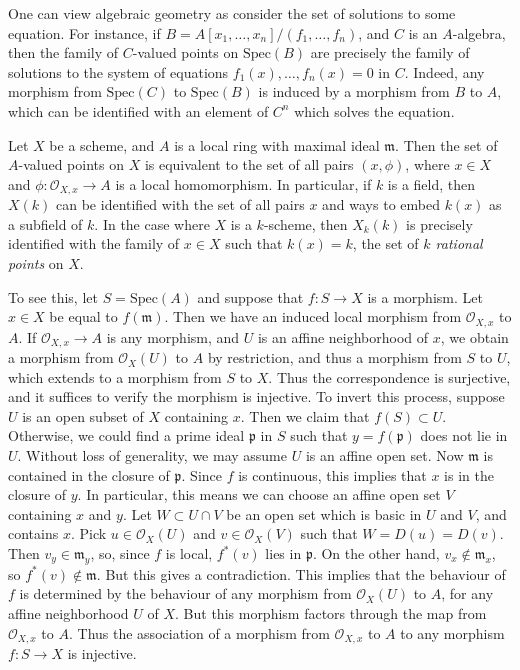 \begin{example}
    One can view algebraic geometry as consider the set of solutions to some equation. For instance, if $B = A[x_1,\dots,x_n]/(f_1,\dots,f_n)$, and $C$ is an $A$-algebra, then the family of $C$-valued points on $\text{Spec}(B)$ are precisely the family of solutions to the system of equations $f_1(x), \dots, f_n(x) = 0$ in $C$. Indeed, any morphism from $\text{Spec}(C)$ to $\text{Spec}(B)$ is induced by a morphism from $B$ to $A$, which can be identified with an element of $C^n$ which solves the equation.
\end{example}

\begin{example}
    Let $X$ be a scheme, and $A$ is a local ring with maximal ideal $\mathfrak{m}$. Then the set of $A$-valued points on $X$ is equivalent to the set of all pairs $(x,\phi)$, where $x \in X$ and $\phi: \mathcal{O}_{X,x} \to A$ is a local homomorphism. In particular, if $k$ is a field, then $X(k)$ can be identified with the set of all pairs $x$ and ways to embed $k(x)$ as a subfield of $k$. In the case where $X$ is a $k$-scheme, then $X_k(k)$ is precisely identified with the family of $x \in X$ such that $k(x) = k$, the set of \emph{$k$ rational points} on $X$.

    To see this, let $S = \text{Spec}(A)$ and suppose that $f: S \to X$ is a morphism. Let $x \in X$ be equal to $f(\mathfrak{m})$. Then we have an induced local morphism from $\mathcal{O}_{X,x}$ to $A$. If $\mathcal{O}_{X,x} \to A$ is any morphism, and $U$ is an affine neighborhood of $x$, we obtain a morphism from $\mathcal{O}_X(U)$ to $A$ by restriction, and thus a morphism from $S$ to $U$, which extends to a morphism from $S$ to $X$. Thus the correspondence is surjective, and it suffices to verify the morphism is injective. To invert this process, suppose $U$ is an open subset of $X$ containing $x$. Then we claim that $f(S) \subset U$. Otherwise, we could find a prime ideal $\mathfrak{p}$ in $S$ such that $y = f(\mathfrak{p})$ does not lie in $U$. Without loss of generality, we may assume $U$ is an affine open set. Now $\mathfrak{m}$ is contained in the closure of $\mathfrak{p}$. Since $f$ is continuous, this implies that $x$ is in the closure of $y$. In particular, this means we can choose an affine open set $V$ containing $x$ and $y$. Let $W \subset U \cap V$ be an open set which is basic in $U$ and $V$, and contains $x$. Pick $u \in \mathcal{O}_X(U)$ and $v \in \mathcal{O}_X(V)$ such that $W = D(u) = D(v)$. Then $v_y \in \mathfrak{m}_y$, so, since $f$ is local, $f^*(v)$ lies in $\mathfrak{p}$. On the other hand, $v_x \not \in \mathfrak{m}_x$, so $f^*(v) \not \in \mathfrak{m}$. But this gives a contradiction. This implies that the behaviour of $f$ is determined by the behaviour of any morphism from $\mathcal{O}_X(U)$ to $A$, for any affine neighborhood $U$ of $X$. But this morphism factors through the map from $\mathcal{O}_{X,x}$ to $A$. Thus the association of a morphism from $\mathcal{O}_{X,x}$ to $A$ to any morphism $f: S \to X$ is injective.
\end{example}

